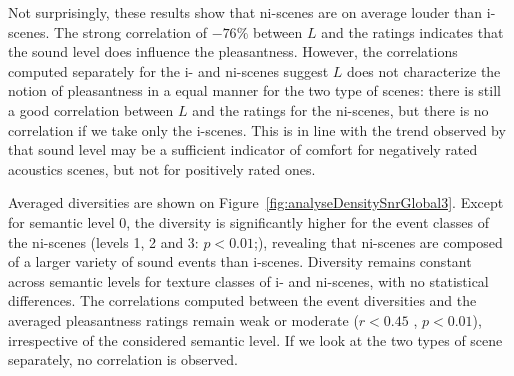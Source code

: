 \documentclass[twoside,twocolumn]{article}
\begin{document}
Not surprisingly, these results show that ni-scenes are on average louder than i-scenes. The strong correlation of $-76\%$ between $L$ and the ratings indicates that the sound level does influence the pleasantness. However, the correlations computed separately for the i- and ni-scenes suggest $L$ does not characterize the notion of pleasantness in a equal manner for the two type of scenes:  there is still a good correlation between $L$ and the ratings for the ni-scenes, but there is no correlation if we take only the i-scenes. This is in line with the trend observed by \cite{lavandier2006contribution} that sound level may be a sufficient indicator of comfort for negatively rated acoustics scenes, but not for positively rated ones.


Averaged diversities are shown on Figure~\ref{fig:analyseDensitySnrGlobal3}. Except for semantic level 0, the diversity is significantly higher for the event classes of the ni-scenes (levels 1, 2 and 3: $p<0.01$;), revealing that ni-scenes are composed of a larger variety of sound events than i-scenes. Diversity remains constant across semantic levels for texture classes of i- and ni-scenes, with no statistical differences.   The correlations computed between the event diversities and the averaged pleasantness ratings remain weak or moderate ($r<0.45$  , $p<0.01$), irrespective of the considered semantic level.  If we look at the two types of scene separately, no correlation is observed. 
\end{document}
